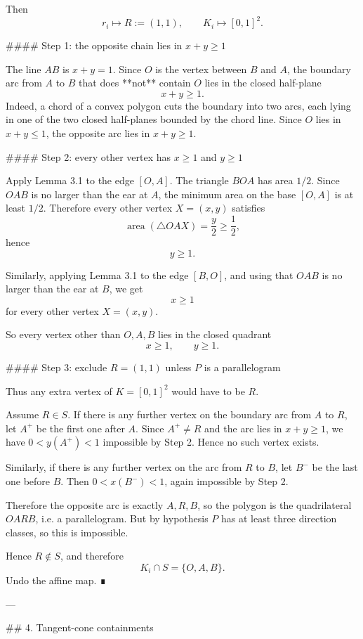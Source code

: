 Then
\[
r_i\mapsto R:=(1,1),\qquad K_i\mapsto [0,1]^2.
\]

#### Step 1: the opposite chain lies in \(x+y\ge 1\)

The line \(AB\) is \(x+y=1\). Since \(O\) is the vertex between \(B\) and \(A\), the boundary arc from \(A\) to \(B\) that does **not** contain \(O\) lies in the closed half-plane
\[
x+y\ge 1.
\]
Indeed, a chord of a convex polygon cuts the boundary into two arcs, each lying in one of the two closed half-planes bounded by the chord line. Since \(O\) lies in \(x+y\le 1\), the opposite arc lies in \(x+y\ge 1\).

#### Step 2: every other vertex has \(x\ge 1\) and \(y\ge 1\)

Apply Lemma 3.1 to the edge \([O,A]\). The triangle \(BOA\) has area \(1/2\). Since \(OAB\) is no larger than the ear at \(A\), the minimum area on the base \([O,A]\) is at least \(1/2\). Therefore every other vertex \(X=(x,y)\) satisfies
\[
\operatorname{area}(\triangle OAX)=\frac{y}{2}\ge \frac12,
\]
hence
\[
y\ge 1.
\]

Similarly, applying Lemma 3.1 to the edge \([B,O]\), and using that \(OAB\) is no larger than the ear at \(B\), we get
\[
x\ge 1
\]
for every other vertex \(X=(x,y)\).

So every vertex other than \(O,A,B\) lies in the closed quadrant
\[
x\ge 1,\qquad y\ge 1.
\]

#### Step 3: exclude \(R=(1,1)\) unless \(P\) is a parallelogram

Thus any extra vertex of \(K=[0,1]^2\) would have to be \(R\).

Assume \(R\in S\). If there is any further vertex on the boundary arc from \(A\) to \(R\), let \(A^+\) be the first one after \(A\). Since \(A^+\neq R\) and the arc lies in \(x+y\ge 1\), we have \(0<y(A^+)<1\) impossible by Step 2. Hence no such vertex exists.

Similarly, if there is any further vertex on the arc from \(R\) to \(B\), let \(B^-\) be the last one before \(B\). Then \(0<x(B^-)<1\), again impossible by Step 2.

Therefore the opposite arc is exactly \(A,R,B\), so the polygon is the quadrilateral \(OARB\), i.e. a parallelogram. But by hypothesis \(P\) has at least three direction classes, so this is impossible.

Hence \(R\notin S\), and therefore
\[
K_i\cap S=\{O,A,B\}.
\]
Undo the affine map. ∎

---

## 4. Tangent-cone containments

